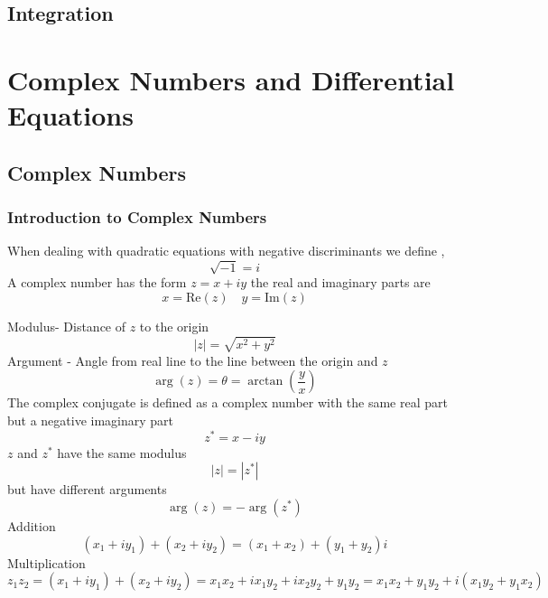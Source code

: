 \documentclass[11pt,titlepage]{article}
\numberwithin{equation}{section}
\begin{document}
\subsection{Integration}



\section{Complex Numbers and Differential Equations}
\subsection{Complex Numbers}
\subsubsection{Introduction to Complex Numbers}
When dealing with quadratic equations with negative discriminants we define ,
\begin{equation}
    \sqrt{ -1 }=i
\end{equation}
A complex number has the form $z=x+iy$ the real and imaginary parts are
\begin{equation}
    x=\mathrm{Re}(z) \quad y=\mathrm{Im}(z)
\end{equation}

Modulus- Distance of $z$ to the origin
\begin{equation}
    |z|=\sqrt{ x^2+y^2 }
\end{equation}
Argument - Angle from real line to the line between the origin and $z$
\begin{equation}
    \arg(z)=\theta=\arctan\left( \frac{y}{x} \right)
\end{equation}
The complex conjugate is defined as a complex number with the same real part but a negative imaginary part
\begin{equation}
    z^{*}=x-iy
\end{equation}
$z$ and $z^{*}$ have the same modulus
\begin{equation}
    |z|=|z^{*}|
\end{equation}
but have different arguments 
\begin{equation}
    \arg(z)=-\arg(z^{*})
\end{equation}
Addition
\begin{equation}
    (x_{1}+iy_{1})+(x_{2}+iy_{2})=(x_{1}+x_{2})+(y_{1}+y_{2})i
\end{equation}
Multiplication
\begin{equation}
    z_{1}z_{2}=(x_{1}+iy_{1})+(x_{2}+iy_{2})=x_{1}x_{2}+ix_{1}y_{2}+ix_{2}y_{2}+y_{1}y_{2}=x_{1}x_{2}+y_{1}y_{2}+i(x_{1}y_{2}+y_{1}x_{2})
\end{equation}
\end{document}
